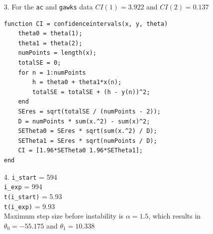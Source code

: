 \documentclass{article}
\begin{document}
\begin{enumerate}
\newpage

\item[3.]
	For the \texttt{ac} and \texttt{gawks} data $CI(1) = 3.922$ and $CI(2) = 0.137$\\

\bigskip

\begin{lstlisting}   
function CI = confidenceintervals(x, y, theta)
    theta0 = theta(1);
    theta1 = theta(2);
    numPoints = length(x);
    totalSE = 0;
    for n = 1:numPoints
        h = theta0 + theta1*x(n);
        totalSE = totalSE + (h - y(n))^2;
    end
    SEres = sqrt(totalSE / (numPoints - 2));
    D = numPoints * sum(x.^2) - sum(x)^2;
    SETheta0 = SEres * sqrt(sum(x.^2) / D);
    SETheta1 = SEres * sqrt(numPoints / D);
    CI = [1.96*SETheta0 1.96*SETheta1];
end
\end{lstlisting}

\newpage

\item[4.]
	\texttt{i\_start} = 594\\
	\texttt{i\_exp} = 994\\
	\texttt{t(i\_start)} = 5.93\\
	\texttt{t(i\_exp)} = 9.93\\
	
	Maximum step size before instability is $\alpha = 1.5$, which results in $\theta_0 = -55.175$ and $\theta_1 = 10.338$\\


\end{enumerate}
\end{document}
